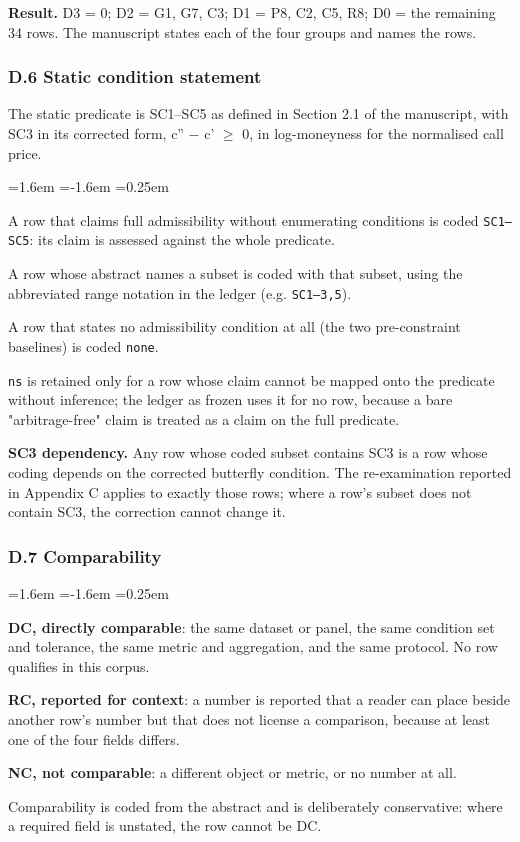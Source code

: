 \documentclass[11pt]{article}
\begin{document}
\textbf{Result.} D3 = 0; D2 = G1, G7, C3; D1 = P8, C2, C5, R8; D0 = the remaining 34 rows. The manuscript states each of the four groups and names the rows.

\subsubsection*{D.6 Static condition statement}
The static predicate is SC1–SC5 as defined in Section 2.1 of the manuscript, with SC3 in its corrected form, c'' − c' $\geq$ 0, in log-moneyness for the normalised call price.

\begin{list}{}{\leftmargin=1.6em \itemindent=-1.6em \itemsep=0.25em}
\item A row that claims full admissibility without enumerating conditions is coded \texttt{SC1–SC5}: its claim is assessed against the whole predicate.
\item A row whose abstract names a subset is coded with that subset, using the abbreviated range notation in the ledger (e.g. \texttt{SC1–3,5}).
\item A row that states no admissibility condition at all (the two pre-constraint baselines) is coded \texttt{none}.
\item \texttt{ns} is retained only for a row whose claim cannot be mapped onto the predicate without inference; the ledger as frozen uses it for no row, because a bare "arbitrage-free" claim is treated as a claim on the full predicate.
\end{list}
\textbf{SC3 dependency.} Any row whose coded subset contains SC3 is a row whose coding depends on the corrected butterfly condition. The re-examination reported in Appendix C applies to exactly those rows; where a row's subset does not contain SC3, the correction cannot change it.

\subsubsection*{D.7 Comparability}
\begin{list}{}{\leftmargin=1.6em \itemindent=-1.6em \itemsep=0.25em}
\item \textbf{DC, directly comparable}: the same dataset or panel, the same condition set and tolerance, the same metric and aggregation, and the same protocol. No row qualifies in this corpus.
\item \textbf{RC, reported for context}: a number is reported that a reader can place beside another row's number but that does not license a comparison, because at least one of the four fields differs.
\item \textbf{NC, not comparable}: a different object or metric, or no number at all.
\end{list}
Comparability is coded from the abstract and is deliberately conservative: where a required field is unstated, the row cannot be DC.
\end{document}
